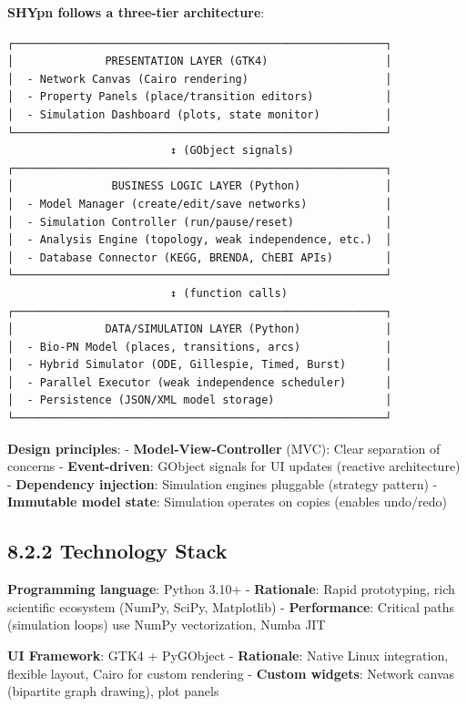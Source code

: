 \textbf{SHYpn follows a three-tier architecture}:

\begin{lstlisting}
┌─────────────────────────────────────────────────────────┐
│              PRESENTATION LAYER (GTK4)                  │
│  - Network Canvas (Cairo rendering)                     │
│  - Property Panels (place/transition editors)           │
│  - Simulation Dashboard (plots, state monitor)          │
└─────────────────────────────────────────────────────────┘
                         ↕ (GObject signals)
┌─────────────────────────────────────────────────────────┐
│               BUSINESS LOGIC LAYER (Python)             │
│  - Model Manager (create/edit/save networks)            │
│  - Simulation Controller (run/pause/reset)              │
│  - Analysis Engine (topology, weak independence, etc.)  │
│  - Database Connector (KEGG, BRENDA, ChEBI APIs)        │
└─────────────────────────────────────────────────────────┘
                         ↕ (function calls)
┌─────────────────────────────────────────────────────────┐
│              DATA/SIMULATION LAYER (Python)             │
│  - Bio-PN Model (places, transitions, arcs)             │
│  - Hybrid Simulator (ODE, Gillespie, Timed, Burst)      │
│  - Parallel Executor (weak independence scheduler)      │
│  - Persistence (JSON/XML model storage)                 │
└─────────────────────────────────────────────────────────┘
\end{lstlisting}

\textbf{Design principles}: - \textbf{Model-View-Controller} (MVC):
Clear separation of concerns - \textbf{Event-driven}: GObject signals
for UI updates (reactive architecture) - \textbf{Dependency injection}:
Simulation engines pluggable (strategy pattern) - \textbf{Immutable
model state}: Simulation operates on copies (enables undo/redo)

\hypertarget{technology-stack}{%
\subsection{8.2.2 Technology Stack}\label{technology-stack}}

\textbf{Programming language}: Python 3.10+ - \textbf{Rationale}: Rapid
prototyping, rich scientific ecosystem (NumPy, SciPy, Matplotlib) -
\textbf{Performance}: Critical paths (simulation loops) use NumPy
vectorization, Numba JIT

\textbf{UI Framework}: GTK4 + PyGObject - \textbf{Rationale}: Native
Linux integration, flexible layout, Cairo for custom rendering -
\textbf{Custom widgets}: Network canvas (bipartite graph drawing), plot
panels

